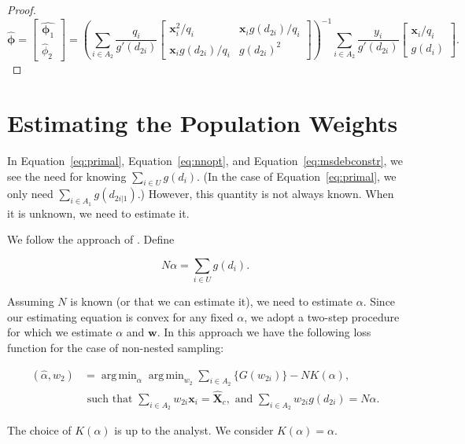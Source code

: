 \documentclass[12pt]{article}
\DeclareMathOperator*{\argmin}{arg\,min}
\renewcommand{\bf}[1]{\mathbf{#1}}
\begin{document}
\begin{proof}
  $$\hat{\bm \phi} =
  \begin{bmatrix}
    \hat{\bm \phi_1} \\ \hat \phi_2
  \end{bmatrix} = 
  \left(\sum_{i \in A_2} \frac{q_i}{g'(d_{2i})} 
  \begin{bmatrix}
    \bf x_i^2 / q_i & \bf x_i g(d_{2i}) / q_i \\
    \bf x_i g(d_{2i}) / q_i & g(d_{2i})^2
  \end{bmatrix}
  \right)^{-1}
  \sum_{i \in A_2} \frac{y_i}{g'(d_{2i})} 
  \begin{bmatrix} \bf x_i / q_i \\ g(d_i) \end{bmatrix}.
  $$

\end{proof}

\section{Estimating the Population Weights}

In Equation~\ref{eq:primal}, Equation~\ref{eq:nnopt}, and
Equation~\ref{eq:msdebconstr}, we see the need for knowing $\sum_{i \in U}
g(d_i)$. (In the case of Equation~\ref{eq:primal}, we only need $\sum_{i \in
A_1} g(d_{2i|1})$.) However, this quantity is not always known. When it is
unknown, we need to estimate it.

We follow the approach of \cite{kwon2024debiased}. Define 

$$N \alpha = \sum_{i \in U} g(d_i).$$

Assuming $N$ is known (or that we can estimate it), we need to estimate
$\alpha$. Since our estimating equation is convex for any fixed $\alpha$, we
adopt a two-step procedure for which we estimate $\alpha$ and $\bf w$. In this
approach we have the following loss function for the case of non-nested sampling:

\begin{align*}
  (\hat \alpha, \hat w_2) 
  &= 
  \argmin_{\alpha} \argmin_{w_2} \sum_{i \in A_2} \{G(w_{2i})\} - NK(\alpha), \\
  &\text{ such that } \sum_{i \in A_2} w_{2i} \bf x_i = \hat{\bf X}_c,
  \text{ and } \sum_{i \in A_2} w_{2i} g(d_{2i}) = N\alpha.
\end{align*}

The choice of $K(\alpha)$ is up to the analyst. We consider $K(\alpha) =
\alpha$.
\end{document}
